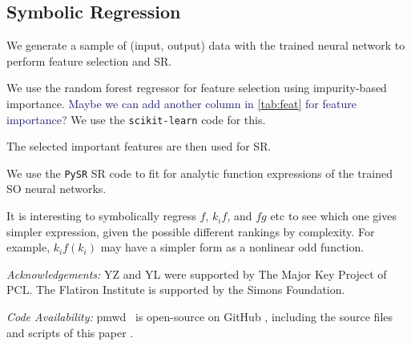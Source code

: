 \documentclass[modern, trackchanges, dvipsnames]{aastex631}
\newcommand{\pmwd}{{\usefont{T1}{nova}{m}{sl}pmwd}}
\newcommand{\YL}[1]{\textcolor{Bittersweet}{#1}}
\newcommand{\YZ}[1]{\textcolor{MidnightBlue}{#1}}
\begin{document}
\subsection{Symbolic Regression}

We generate a sample of (input, output) data with the trained neural network to
perform feature selection and SR.

We use the random forest regressor for feature selection using impurity-based
importance.
\YZ{Maybe we can add another column in \autoref{tab:feat} for feature
importance?}
We use the \texttt{scikit-learn} \citep{scikit-learn} code for this.

The selected important features are then used for SR.

We use the \texttt{PySR} \citep{Cranmer2023} SR code to fit for analytic
function expressions of the trained SO neural networks.

\YL{It is interesting to symbolically regress $f$, $k_i f$, and $f g$
etc to see which one gives simpler expression, given the possible
different rankings by complexity.
For example, $k_i f(k_i)$ may have a simpler form as a nonlinear odd
function.}


\vspace{1em}
\textit{\large Acknowledgements:}
YZ and YL were supported by The Major Key Project of PCL.
The Flatiron Institute is supported by the Simons Foundation.


\vspace{1em}
\textit{\large Code Availability:}
\pmwd\ \citep{Li2022b} is open-source on GitHub
\href{https://github.com/eelregit/pmwd}{\faGithub}, including the source
files and scripts of this paper
\href{https://github.com/eelregit/pmwd/tree/master/docs/papers/sto}{\faFile}.








\end{document}
